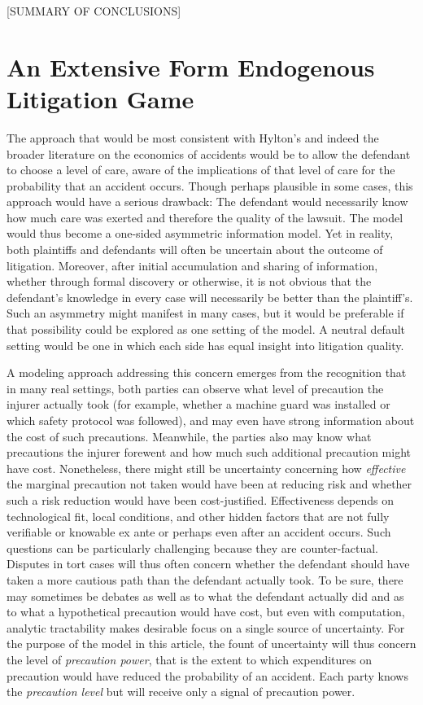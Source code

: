 \documentclass{article}
\begin{document}
[SUMMARY OF CONCLUSIONS]

\section{An Extensive Form Endogenous Litigation Game}

The approach that would be most consistent with Hylton's and indeed the broader literature on the economics of accidents would be to allow the defendant to choose a level of care, aware of the implications of that level of care for the probability that an accident occurs. Though perhaps plausible in some cases, this approach would have a serious drawback: The defendant would necessarily know how much care was exerted and therefore the quality of the lawsuit. The model would thus become a one-sided asymmetric information model. Yet in reality, both plaintiffs and defendants will often be uncertain about the outcome of litigation. Moreover, after initial accumulation and sharing of information, whether through formal discovery or otherwise, it is not obvious that the defendant's knowledge in every case will necessarily be better than the plaintiff's. Such an asymmetry might manifest in many cases, but it would be preferable if that possibility could be explored as one setting of the model. A neutral default setting would be one in which each side has equal insight into litigation quality. 

A modeling approach addressing this concern emerges from the recognition that in many real settings, both parties can observe what level of precaution the injurer actually took (for example, whether a machine guard was installed or which safety protocol was followed), and may even have strong information about the cost of such precautions. Meanwhile, the parties also may know what precautions the injurer forewent and how much such additional precaution might have cost. Nonetheless, there might still be uncertainty concerning how \emph{effective} the marginal precaution not taken would have been at reducing risk and whether such a risk reduction would have been cost-justified. Effectiveness depends on technological fit, local conditions, and other hidden factors that are not fully verifiable or knowable ex ante or perhaps even after an accident occurs. Such questions can be particularly challenging because they are counter-factual. Disputes in tort cases will thus often concern whether the defendant should have taken a more cautious path than the defendant actually took. To be sure, there may sometimes be debates as well as to what the defendant actually did and as to what a hypothetical precaution would have cost, but even with computation, analytic tractability makes desirable focus on a single source of uncertainty. For the purpose of the model in this article, the fount of uncertainty will thus concern the level of \emph{precaution power}, that is the extent to which expenditures on precaution would have reduced the probability of an accident. Each party knows the \emph{precaution level} but will receive only a signal of precaution power. 
\end{document}
